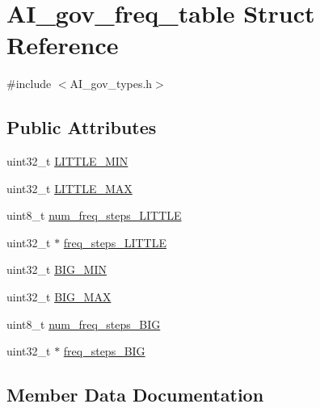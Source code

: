 \hypertarget{structAI__gov__freq__table}{}\section{A\+I\+\_\+gov\+\_\+freq\+\_\+table Struct Reference}
\label{structAI__gov__freq__table}


{\ttfamily \#include $<$A\+I\+\_\+gov\+\_\+types.\+h$>$}

\subsection*{Public Attributes}
\begin{DoxyCompactItemize}
\item 
uint32\+\_\+t \hyperlink{structAI__gov__freq__table_abe30156528207c968f442988970f48ab}{L\+I\+T\+T\+L\+E\+\_\+\+M\+IN}
\item 
uint32\+\_\+t \hyperlink{structAI__gov__freq__table_a487a15869abfa7274cfab99d3696e92f}{L\+I\+T\+T\+L\+E\+\_\+\+M\+AX}
\item 
uint8\+\_\+t \hyperlink{structAI__gov__freq__table_af0f2819b54a5be653ed1ac4347b47f87}{num\+\_\+freq\+\_\+steps\+\_\+\+L\+I\+T\+T\+LE}
\item 
uint32\+\_\+t $\ast$ \hyperlink{structAI__gov__freq__table_a5bd1d1263478c657c0a409af9f39def4}{freq\+\_\+steps\+\_\+\+L\+I\+T\+T\+LE}
\item 
uint32\+\_\+t \hyperlink{structAI__gov__freq__table_a8bfd92a2cc2b3d87d1104d8bc6aacefb}{B\+I\+G\+\_\+\+M\+IN}
\item 
uint32\+\_\+t \hyperlink{structAI__gov__freq__table_ac6ad5de33a766ffdfd62a7226c3f2bc9}{B\+I\+G\+\_\+\+M\+AX}
\item 
uint8\+\_\+t \hyperlink{structAI__gov__freq__table_ab36ee7c453a8b227bca4a29181ff57fc}{num\+\_\+freq\+\_\+steps\+\_\+\+B\+IG}
\item 
uint32\+\_\+t $\ast$ \hyperlink{structAI__gov__freq__table_a74a2467085ab31c3cccd83f2b8bab49d}{freq\+\_\+steps\+\_\+\+B\+IG}
\end{DoxyCompactItemize}


\subsection{Member Data Documentation}
\mbox{\label{structAI__gov__freq__table_ac6ad5de33a766ffdfd62a7226c3f2bc9}} 
